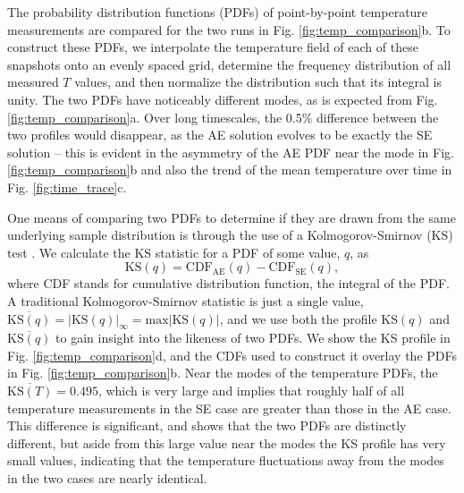 \documentclass[aps, pre, onecolumn, nofootinbib, notitlepage, groupedaddress, amsfonts, amssymb, amsmath, longbibliography]{revtex4-1}
\newcommand{\KS}[1]{\ensuremath{\text{KS}(#1)}}
\newcommand{\KSstat}[1]{\ensuremath{\overline{\text{KS}(#1)}}}
\begin{document}
The probability distribution functions (PDFs)
of point-by-point temperature measurements are compared for the two runs
in Fig. \ref{fig:temp_comparison}b. To construct these PDFs, 
we interpolate the temperature field
of each of these snapshots onto an evenly spaced grid, determine the
frequency distribution of all measured $T$ values, and then normalize the
distribution such that its integral is unity.  The two PDFs have noticeably
different modes, as is expected from Fig. \ref{fig:temp_comparison}a. 
Over long timescales, the 0.5\% difference between the two profiles would
disappear, as the AE solution evolves to be exactly the SE solution -- this
is evident in the asymmetry of the AE PDF near the mode
in Fig. \ref{fig:temp_comparison}b and also
the trend of the mean temperature over time in Fig. \ref{fig:time_trace}c.

One means of comparing two
PDFs to determine if they are drawn from the same underlying
sample distribution is through the use of a Kolmogorov-Smirnov (KS) test \cite{wall&jenkins2012}.
We calculate the KS statistic for a PDF of some value, $q$, as
\begin{equation}
\KS{q} = \text{CDF}_{\text{AE}}(q) - \text{CDF}_{\text{SE}}(q),
\label{eqn:ks_profile}
\end{equation}
where CDF stands for cumulative distribution function, the integral of the PDF.
A traditional Kolmogorov-Smirnov statistic is just a single value,
$\KSstat{q} = |\KS{q}|_\infty =
\text{max} |\KS{q}|$, and we use both the profile KS$(q)$ and
$\KSstat{q}$ to gain insight into the likeness of two PDFs. 
We show the KS profile in Fig. \ref{fig:temp_comparison}d, and the
CDFs used to construct it overlay the PDFs in Fig. \ref{fig:temp_comparison}b.
Near the modes of the temperature PDFs, the $\KSstat{T} = 0.495$, 
which is very large and implies that roughly half of all temperature
measurements in the SE case are greater than those in the AE case.
This difference is significant, and shows that the two PDFs are distinctly different,
but aside from this large value near the modes the KS profile has very small values,
indicating that the temperature fluctuations away from the modes in the two cases are nearly identical.
\end{document}
